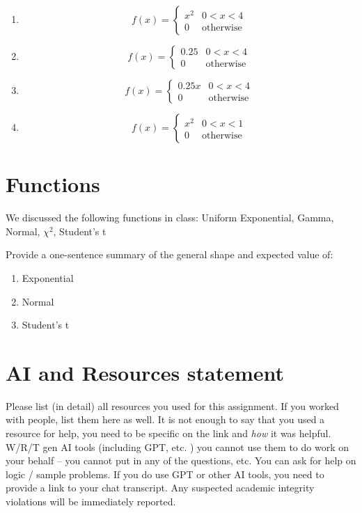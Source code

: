 \documentclass[
]{article}
\providecommand{\tightlist}{%
  \setlength{\itemsep}{0pt}\setlength{\parskip}{0pt}}
\begin{document}
\begin{enumerate}
\def\labelenumi{\alph{enumi}.}
\item
  \[
  f(x) = \begin{cases}
  x^2 &  0 < x < 4 \\
  0 & \text{otherwise}
  \end{cases}
  \]
\item
  \[
  f(x) = \begin{cases}
  0.25 &  0 < x < 4 \\
  0 & \text{otherwise}
  \end{cases}
  \]
\item
  \[
  f(x) = \begin{cases}
  0.25x &  0 < x < 4 \\
  0 & \text{otherwise}
  \end{cases}
  \]
\item
  \[
  f(x) = \begin{cases}
  x^2 &  0 < x < 1 \\
  0 & \text{otherwise}
  \end{cases}
  \]
\end{enumerate}

\section{Functions}\label{functions}

We discussed the following functions in class: Uniform Exponential,
Gamma, Normal, \(\chi^2\), Student's t

Provide a one-sentence summary of the general shape and expected value
of:

\begin{enumerate}
\def\labelenumi{\alph{enumi}.}
\tightlist
\item
  Exponential
\item
  Normal
\item
  Student's t
\end{enumerate}

\section{AI and Resources statement}\label{ai-and-resources-statement}

Please list (in detail) all resources you used for this assignment. If
you worked with people, list them here as well. It is not enough to say
that you used a resource for help, you need to be specific on the link
and \emph{how} it was helpful. W/R/T gen AI tools (including GPT, etc. )
you cannot use them to do work on your behalf -- you cannot put in any
of the questions, etc. You can ask for help on logic / sample problems.
If you do use GPT or other AI tools, you need to provide a link to your
chat transcript. Any suspected academic integrity violations will be
immediately reported.
\end{document}
